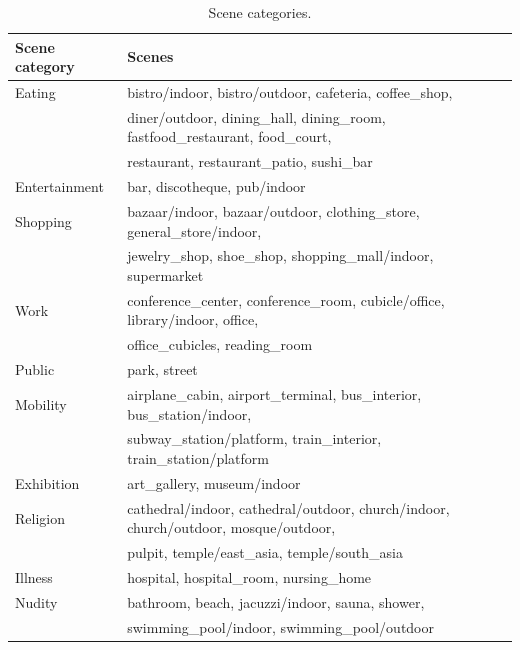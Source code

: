 \begin{table}[tb]
\centering
\caption{Scene categories.}
\label{tbl-scenecate}
\begin{tabular}{ll}
\toprule
Scene category & Scenes                                                  \\ \midrule
Eating         & bistro/indoor, bistro/outdoor, cafeteria, coffee\_shop, \\
               & diner/outdoor, dining\_hall, dining\_room, fastfood\_restaurant, food\_court, \\
               & restaurant, restaurant\_patio, sushi\_bar            \\ \midrule
Entertainment  & bar, discotheque, pub/indoor                         \\ \midrule
Shopping       & bazaar/indoor, bazaar/outdoor, clothing\_store, general\_store/indoor, \\
               & jewelry\_shop, shoe\_shop, shopping\_mall/indoor, supermarket  \\ \midrule
Work           & conference\_center, conference\_room, cubicle/office, library/indoor, office, \\
               & office\_cubicles, reading\_room                      \\ \midrule
Public         & park, street                                         \\ \midrule
Mobility       & airplane\_cabin, airport\_terminal, bus\_interior, bus\_station/indoor, \\
               & subway\_station/platform, train\_interior, train\_station/platform \\ \midrule
Exhibition     & art\_gallery, museum/indoor                          \\ \midrule
Religion       & cathedral/indoor, cathedral/outdoor, church/indoor, church/outdoor, mosque/outdoor, \\
               & pulpit, temple/east\_asia, temple/south\_asia        \\ \midrule
Illness        & hospital, hospital\_room, nursing\_home                \\ \midrule
Nudity         & bathroom, beach, jacuzzi/indoor, sauna, shower, \\
               & swimming\_pool/indoor, swimming\_pool/outdoor        \\ \bottomrule
\end{tabular}
\end{table}




